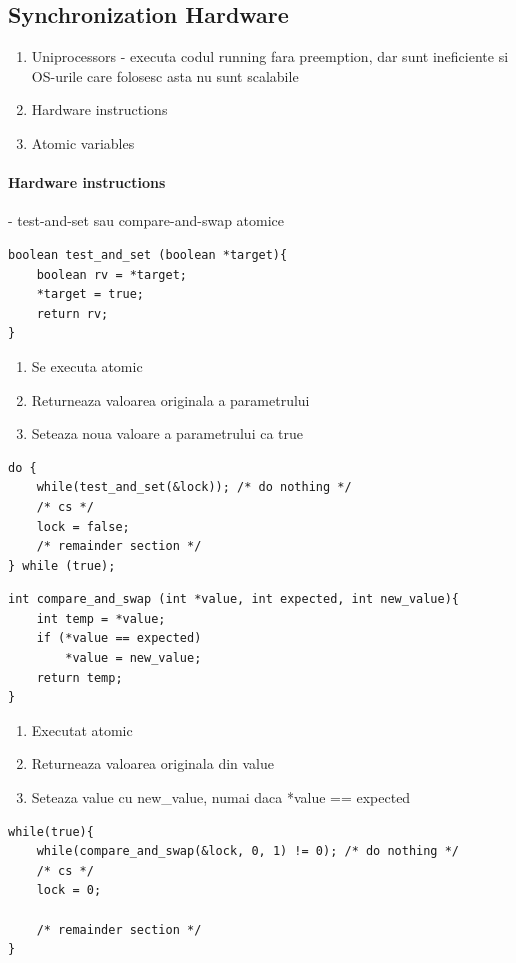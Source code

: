 \documentclass{article}
\begin{document}
\subsection*{Synchronization Hardware}
\begin{enumerate}
    \item Uniprocessors - executa codul running fara preemption, dar sunt ineficiente si OS-urile care folosesc asta nu sunt scalabile
    \item Hardware instructions
    \item Atomic variables
\end{enumerate}

\paragraph*{Hardware instructions} - test-and-set sau compare-and-swap atomice
\begin{lstlisting}
boolean test_and_set (boolean *target){
    boolean rv = *target;
    *target = true;
    return rv;
}
\end{lstlisting}
\begin{enumerate}
    \item Se executa atomic
    \item Returneaza valoarea originala a parametrului
    \item Seteaza noua valoare a parametrului ca true
\end{enumerate}

\begin{lstlisting}
do {
    while(test_and_set(&lock)); /* do nothing */
    /* cs */
    lock = false;
    /* remainder section */
} while (true);
\end{lstlisting}

\begin{lstlisting}
int compare_and_swap (int *value, int expected, int new_value){
    int temp = *value;
    if (*value == expected)
        *value = new_value;
    return temp;
}
\end{lstlisting}
\begin{enumerate}
    \item Executat atomic
    \item Returneaza valoarea originala din value
    \item Seteaza value cu new\_value, numai daca *value == expected
\end{enumerate}

\begin{lstlisting}
while(true){
    while(compare_and_swap(&lock, 0, 1) != 0); /* do nothing */
    /* cs */
    lock = 0;

    /* remainder section */
}
\end{lstlisting}
\end{document}
